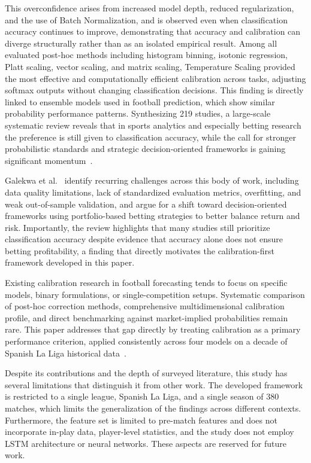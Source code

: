 \documentclass[conference]{IEEEtran}
\begin{document}
This overconfidence arises from increased model depth, reduced
regularization, and the use of Batch Normalization, and is
observed even when classification accuracy continues to improve,
demonstrating that accuracy and calibration can diverge
structurally rather than as an isolated empirical result.
Among all evaluated post-hoc methods including histogram binning,
isotonic regression, Platt scaling, vector scaling, and matrix
scaling, Temperature Scaling provided the most effective and
computationally efficient calibration across tasks, adjusting
softmax outputs without changing classification decisions.
This finding is directly linked to ensemble models used in
football prediction, which show similar probability performance
patterns. Synthesizing 219 studies, a large-scale systematic
review reveals that in sports analytics and especially betting
research the preference is still given to classification
accuracy, while the call for stronger probabilistic standards and
strategic decision-oriented frameworks is gaining significant
momentum~\cite{b10}.

Galekwa et al.~\cite{b10} identify recurring challenges across
this body of work, including data quality limitations, lack of
standardized evaluation metrics, overfitting, and weak
out-of-sample validation, and argue for a shift toward
decision-oriented frameworks using portfolio-based betting
strategies to better balance return and risk. Importantly, the
review highlights that many studies still prioritize
classification accuracy despite evidence that accuracy alone does
not ensure betting profitability, a finding that directly
motivates the calibration-first framework developed in this paper.

Existing calibration research in football forecasting tends to
focus on specific models, binary formulations, or
single-competition setups. Systematic comparison of post-hoc
correction methods, comprehensive multidimensional calibration
profile, and direct benchmarking against market-implied
probabilities remain rare. This paper addresses that gap directly
by treating calibration as a primary performance criterion,
applied consistently across four models on a decade of Spanish
La Liga historical data~\cite{b13}.

Despite its contributions and the depth of surveyed literature,
this study has several limitations that distinguish it from other
work. The developed framework is restricted to a single league,
Spanish La Liga, and a single season of 380 matches, which limits
the generalization of the findings across different contexts.
Furthermore, the feature set is limited to pre-match features and
does not incorporate in-play data, player-level statistics, and
the study does not employ LSTM architecture or neural networks.
These aspects are reserved for future work.
\end{document}
